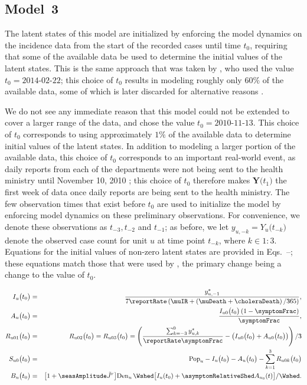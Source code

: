 \subsection{Model~3}

The latent states of this model are initialized by enforcing the model dynamics on the incidence data from the start of the recorded cases until time $t_0$, requiring that some of the available data be used to determine the initial values of the latent states.
This is the same approach that was taken by \citet{lee20}, who used the value $t_0 = \text{2014-02-22}$; this choice of $t_0$ results in modeling roughly only $60\%$ of the available data, some of which is later discarded for alternative reasons \citep{lee20sup}.

We do not see any immediate reason that this model could not be extended to cover a larger range of the data, and chose the value $t_0 = \text{2010-11-13}$.
This choice of $t_0$ corresponds to using approximately $1\%$ of the available data to determine initial values of the latent states.
In addition to modeling a larger portion of the available data, this choice of $t_0$ corresponds to an important real-world event, as daily reports from each of the departments were not being sent to the health ministry until November 10, 2010 \citep{barzilay13};
this choice of $t_0$ therefore makes $\bm{Y}\big(t_1\big)$ the first week of data once daily reports are being sent to the health ministry.
The few observation times that exist before $t_0$ are used to initialize the model by enforcing model dynamics on these preliminary observations.
For convenience, we denote these observations as $t_{-3}, t_{-2}$ and $t_{-1}$; as before, we let $y_{u,-k} = Y_{u}\big(t_{-k}\big)$ denote the observed case count for unit $u$ at time point $t_{-k}$, where $k \in 1:3$.
Equations for the initial values of non-zero latent states are provided in Eqs.~--; these equations match those that were used by \citet{lee20}, the primary change being a change to the value of $t_0$.

\begin{eqnarray}
\label{eq:model3:I0}
I_{u}\big(t_0\big) &=& \frac{y^*_{u, -1}}{7\reportRate\left(\muIR + \left(\muDeath + \choleraDeath\right)/365\right)},
\\%
\label{eq:model3:A0}
A_{u}\big(t_0\big) &=& \frac{I_{u0}\big(t_0\big)\left(1 - \symptomFrac\right)}{\symptomFrac},
\\
\label{eq:model3:R0}
R_{u01}\big(t_0\big) &=& R_{u02}\big(t_0\big) = R_{u03}\big(t_0\big) = \left(\frac{\sum_{k = -3}^0 y^*_{u, k}}{\reportRate \symptomFrac} - \left(I_{u0}\big(t_0\big) + A_{u0}\big(t_0\big)\right)\right) / 3
\\
\label{eq:model3:S0}
S_{u0}\big(t_0\big) &=& \mathrm{Pop}_u - I_{u}\big(t_0\big) - A_{u}\big(t_0\big) - \sum_{k=1}^3 R_{u0k}\big(t_0\big)
\\
\label{eq:model3:B0}
B_{u}\big(t_0\big) &=& \big[1 + \seasAmplitude \tilde{J}^r \big] \mathrm{Den}_u \, \Wshed \big[ I_{u}(t_0)+ \asymptomRelativeShed A_{u_0}(t) \big]/\Wshed.
\end{eqnarray}

